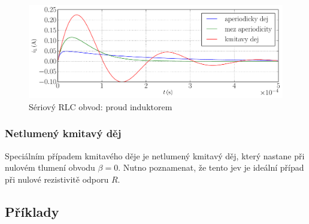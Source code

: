 \begin{figure}[h!]
\centering
\includegraphics[width=13cm]{prechodne_jevy/druhy_rad/obvod_rlc_proud.pdf}
\caption{Sériový RLC obvod: proud induktorem}
\label{fig:obvod_rlc_proud}
\end{figure}

\subsubsection{Netlumený kmitavý děj}

Speciálním případem kmitavého děje je netlumený kmitavý děj, který nastane při nulovém tlumení obvodu $\beta = 0$. Nutno poznamenat, že tento jev je ideální případ při nulové rezistivitě odporu $R$.

\subsection{Příklady}

